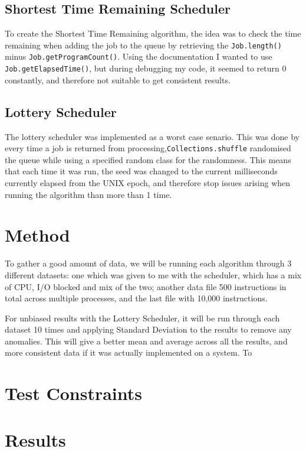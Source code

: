 \documentclass{acm_proc_article-sp}
\begin{document}
\subsection{Shortest Time Remaining Scheduler}

To create the Shortest Time Remaining algorithm, the idea was to check the time remaining when adding the job to the queue by retrieving the \texttt{Job.length()} minus \texttt{Job.get\-ProgramCount()}. Using the documentation I wanted to use \texttt{Job.getElapsedTime()}, but during debugging my code, it seemed to return 0 constantly, and therefore not suitable to get consistent results.

\subsection{Lottery Scheduler}

The lottery scheduler was implemented as a worst case senario. This was done by every time a job is returned from processing,\texttt{Collections.shuffle} randomised the queue  while using a specified random class for the randomness. This means that each time it was run, the seed was changed to the current milliseconds currently elapsed from the UNIX epoch, and therefore stop issues arising when running the algorithm than more than 1 time.

\section{Method}

To gather a good amount of data, we will be running each algorithm through 3 different datasets: one which was given to me with the scheduler, which has a mix of CPU, I/O blocked and mix of the two; another data file 500 instructions in total across multiple processes, and the last file with 10,000 instructions. 

For unbiased results with the Lottery Scheduler, it will be run through each dataset 10 times and applying Standard Deviation to the results to remove any anomalies. This will give a better mean and average across all the results, and more consistent data if it was actually implemented on a system. To 

\section{Test Constraints}

\section{Results}
\end{document}
